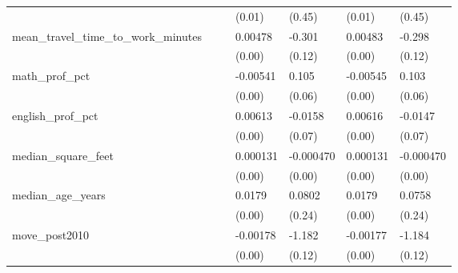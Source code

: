 {\begin{longtable}{|l|ll|ll|ll|}
                        &                     &                     &      (0.01)         &      (0.45)         &      (0.01)         &      (0.45)         \\
            [1em]
            mean\_travel\_time\_to\_work\_minutes&                     &                     &     0.00478\sym{**} &      -0.301\sym{*}  &     0.00483\sym{**} &      -0.298\sym{*}  \\
                        &                     &                     &      (0.00)         &      (0.12)         &      (0.00)         &      (0.12)         \\
            [1em]
            math\_prof\_pct&                     &                     &    -0.00541\sym{***}&       0.105         &    -0.00545\sym{***}&       0.103         \\
                        &                     &                     &      (0.00)         &      (0.06)         &      (0.00)         &      (0.06)         \\
            [1em]
            english\_prof\_pct&                     &                     &     0.00613\sym{***}&     -0.0158         &     0.00616\sym{***}&     -0.0147         \\
                        &                     &                     &      (0.00)         &      (0.07)         &      (0.00)         &      (0.07)         \\
            [1em]
            median\_square\_feet&                     &                     &    0.000131\sym{***}&   -0.000470         &    0.000131\sym{***}&   -0.000470         \\
                        &                     &                     &      (0.00)         &      (0.00)         &      (0.00)         &      (0.00)         \\
            [1em]
            median\_age\_years&                     &                     &      0.0179\sym{***}&      0.0802         &      0.0179\sym{***}&      0.0758         \\
                        &                     &                     &      (0.00)         &      (0.24)         &      (0.00)         &      (0.24)         \\
            [1em]
            move\_post2010&                     &                     &    -0.00178         &      -1.182\sym{***}&    -0.00177         &      -1.184\sym{***}\\
                        &                     &                     &      (0.00)         &      (0.12)         &      (0.00)         &      (0.12)         \\

\end{longtable}}
